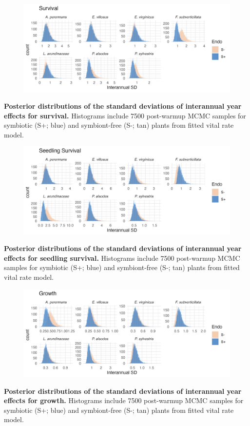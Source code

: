 \documentclass[12pt]{article}
\begin{document}
\begin{figure}[H]
	\centering
	\includegraphics[width=.9\linewidth]{surv_sigmayear_hist.png}
\end{figure}
 \textbf{Posterior distributions of the standard deviations of interannual year effects for survival.} Histograms include 7500 post-warmup MCMC samples for symbiotic (S+; blue) and symbiont-free (S-; tan) plants from fitted vital rate model.


\begin{figure}[H]
	\centering
	\includegraphics[width=.9\linewidth]{seedsurv_sigmayear_hist.png}
\end{figure}
 \textbf{Posterior distributions of the standard deviations of interannual year effects for seedling survival.} Histograms include 7500 post-warmup MCMC samples for symbiotic (S+; blue) and symbiont-free (S-; tan) plants from fitted vital rate model.
\newpage

\begin{figure}[H]
	\centering
	\includegraphics[width=.9\linewidth]{grow_sigmayear_hist.png}
\end{figure}
 \textbf{Posterior distributions of the standard deviations of interannual year effects for growth.} Histograms include 7500 post-warmup MCMC samples for symbiotic (S+; blue) and symbiont-free (S-; tan) plants from fitted vital rate model.
\end{document}
